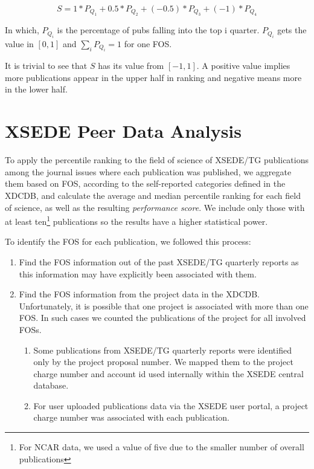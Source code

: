 \documentclass{sig-alternate}
\begin{document}
\[	S = 1*P_{Q_1} + 0.5*P_{Q_2}+ (-0.5)*P_{Q_3} + (-1)*P_{Q_4} \]

In which, $P_{Q_i}$ is the percentage of pubs falling into the top i quarter. $P_{Q_i}$ gets the value in $[0,1]$ and $\sum_{i} {P_{Q_i}} = 1$ for one FOS.

It is trivial to see that $S$ has its value from $[-1, 1]$. A positive value implies more publications appear in the upper half in ranking and negative means more in the lower half.

\section{XSEDE Peer Data Analysis}
\label{S:xsede}

To apply the percentile ranking to the field of science of XSEDE/TG publications among the journal issues where each publication was published, we aggregate them based on FOS, according to the self-reported categories defined in the XDCDB, and calculate the average and median percentile ranking for each field of science, as well as the resulting  \emph{performance score}. We include only those with at least ten\footnote{For NCAR data, we used a value of five due to the smaller number of overall publications} publications so the results have a higher statistical power. 

To identify the FOS for each publication, we followed this process:

\begin{enumerate}

\item Find the FOS information out of the past XSEDE/TG quarterly reports as this information may have explicitly been associated with them.

\item Find the FOS information from the project data in the XDCDB. Unfortunately, it is possible that one project is associated with more than one FOS. In such cases we counted the publications of the project for all involved FOSs.

\begin{enumerate}

\item Some publications from XSEDE/TG quarterly reports were identified only by the project proposal number. We mapped them to the project charge number and account id used internally within the XSEDE central database.

\item For user uploaded publications data via the XSEDE user portal, a project charge number was associated with each publication.

\end{enumerate}

\end{enumerate}
\end{document}
